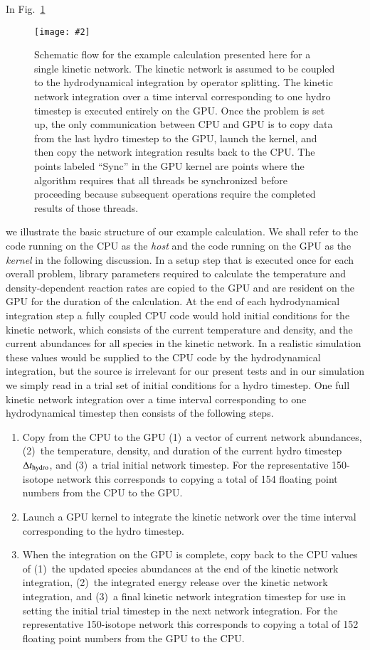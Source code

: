 \documentclass[]{elsart}
\newlength{\figdn}
\newcommand{\fig}[1]{Fig.~\ref{fig:#1}}
\newcommand{\tsub}[1]{_{\mbox{\scriptsize#1}}}
\newcommand{\singlefig}[6]{%
\begin{figure} \vspace{#3}%
\begin{flushright}%
\texttt{[image: \#2]}%
\end{flushright}%
\caption{\label{fig:#1} #6}%
\vspace{#4}%
\end{figure}}
\begin{document}
In \fig{CUDAnetworkFlow}
%
%
\singlefig
{CUDAnetworkFlow}
{figures/CUDAnetworkFlow.eps}
{0pt}
{\figdn}
{0.65}
{Schematic flow for the example calculation presented here for a single kinetic 
network. The kinetic network is assumed to be coupled to the hydrodynamical 
integration by operator splitting. The kinetic network integration over a time 
interval corresponding to one hydro timestep is executed entirely on the GPU.  
Once the problem is set up, the only communication between CPU and GPU is to 
copy data from the last hydro timestep to the GPU, launch the kernel, and then 
copy the network integration results back to the CPU. The points labeled 
``Sync'' in the GPU kernel are points where the algorithm requires that all 
threads be synchronized before proceeding because subsequent operations require 
the completed results of those threads.}
%
%
we illustrate the basic structure of our example calculation. We shall refer to 
the code running on the CPU as the {\em host} and the code running on the GPU as 
the {\em kernel} in the following discussion.  In a setup step that is executed 
once for each overall problem, library parameters required to calculate the 
temperature and density-dependent reaction rates are copied to the GPU and are 
resident on the GPU for the duration of the calculation. At the end of each 
hydrodynamical integration step a fully coupled CPU code would hold initial 
conditions for the kinetic network, which consists of the current temperature 
and density, and the current abundances for all species in the kinetic network. 
In a realistic simulation these values would be supplied to the CPU code by the 
hydrodynamical integration, but the source is irrelevant for our present tests 
and in our simulation we simply read in a trial set of initial conditions for a 
hydro timestep. One full kinetic network integration over a time interval 
corresponding to one hydrodynamical timestep then consists of the following 
steps.
\begin{enumerate}
 \item
Copy from the CPU to the GPU (1)~a vector of current network abundances, 
(2)~the temperature, density, and duration of the current hydro timestep 
$\Delta t\tsub{hydro}$, and (3)~a trial initial network timestep. For the 
representative 150-isotope network this corresponds to copying a total of 154 
floating point numbers from the CPU to the GPU.
\item
Launch a GPU kernel to integrate the kinetic network over the time interval
corresponding to the hydro timestep.
\item
When the integration on the GPU is complete, copy back to the CPU values of 
(1)~the updated species abundances at the end of the kinetic network 
integration, (2)~the integrated energy release over the kinetic network 
integration, and (3)~a final kinetic network integration timestep for use in 
setting the initial trial timestep in the next network integration. For the 
representative 150-isotope network this corresponds to copying a total of 152 
floating point numbers from the GPU to the CPU.
\end{enumerate}
\end{document}
